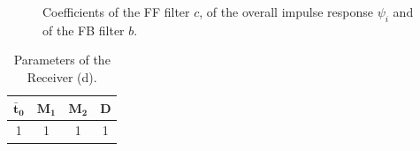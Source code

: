 \documentclass[a4paper, 12pt]{report}
\begin{document}
\begin{figure}[H]
	\centering
	\quad
	\caption{Coefficients of the FF filter $c$, of the overall impulse response $\psi_i$ and of the FB filter $b$.}\label{rec_d}
\end{figure}

\begin{table}[H]
	\centering
	\begin{tabular}{c c c c}
		\toprule
		$\mathbf{\bar{t}_0}$ & $\mathbf{M_1}$ & $\mathbf{M_2}$ & \textbf{D}     \\
		\midrule
		1 & 1 & 1 & 1 \\
		\bottomrule			
	\end{tabular}
	\caption{Parameters of the Receiver (d).}
	\label{Tab_d}
\end{table}
\end{document}
